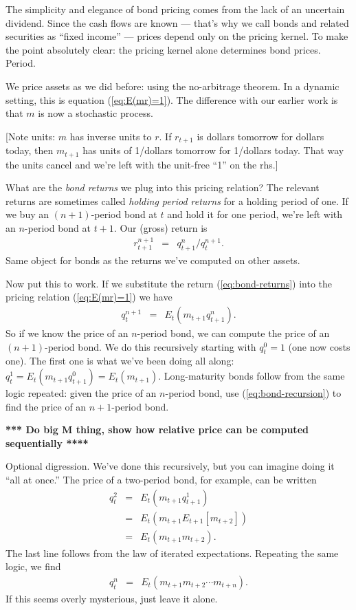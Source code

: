 \documentclass[11pt]{article}
\begin{document}
The simplicity and elegance of bond pricing comes
from the lack of an uncertain dividend.
Since the cash flows are known ---
that's why we call bonds and related securities as ``fixed income'' ---
prices depend only on the pricing kernel.
To make the point absolutely clear:  the pricing kernel alone determines
bond prices.  Period.


We price assets as we did before:  using the no-arbitrage theorem.
In a dynamic setting, this is equation (\ref{eq:E(mr)=1}).
The difference with our earlier work is that $m$ is now a stochastic process.

[Note units:  $m$ has inverse units to $r$.
If $r_{t+1}$ is dollars tomorrow for dollars today,
then $m_{t+1}$ has units of 1/dollars tomorrow
for 1/dollars today.
That way the units cancel and we're left with the unit-free ``1'' on the rhs.]

What are the {\it bond returns\/} we plug into this pricing relation?
The relevant returns are sometimes called {\it holding period returns\/}
for a holding period of one.
If we buy an $(n+1)$-period bond at $t$ and hold it for one period,
we're left with an $n$-period bond at $t+1$.
Our (gross) return is
\begin{eqnarray}
        r^{n+1}_{t+1} &=&  q^n_{t+1}/q^{n+1}_t .
        \label{eq:bond-returns}
\end{eqnarray}
Same object for bonds as the returns we've computed on
other assets.


Now put this to work.  If we substitute the return (\ref{eq:bond-returns})
into the pricing relation (\ref{eq:E(mr)=1}) we have
\begin{eqnarray}
    q^{n+1}_t &=& E_t \left( m_{t+1} q^n_{t+1} \right) .
    \label{eq:bond-recursion}
\end{eqnarray}
So if we know the price of an $n$-period bond,
we can compute the price of an $(n+1)$-period bond.
We do this recursively starting with $q^0_t = 1$ (one now costs one).
The first one is what we've been doing all along:
$ q^1_t = E_t (m_{t+1} q^0_{t+1}) = E_t (m_{t+1})$.
Long-maturity bonds follow from the same logic repeated:
given the price of an $n$-period bond,
use (\ref{eq:bond-recursion}) to find the price of an $n+1$-period bond.

{\bf **** Do big M thing, show how relative price can be computed sequentially ****}

Optional digression.
We've done this recursively, but you can imagine doing it ``all at once.''
The price of a two-period bond, for example, can be written
\begin{eqnarray*}
    q^{2}_t &=& E_t \left( m_{t+1} q^1_{t+1} \right) \\
            &=& E_t \left( m_{t+1} E_{t+1} [m_{t+2}] \right) \\
            &=& E_t \left( m_{t+1} m_{t+2} \right) .
\end{eqnarray*}
The last line follows from the law of iterated expectations.
Repeating the same logic, we find
\begin{eqnarray*}
    q^{n}_t  &=& E_t \left( m_{t+1} m_{t+2} \cdots m_{t+n} \right) .
\end{eqnarray*}
If this seems overly mysterious, just leave it alone.
\end{document}
